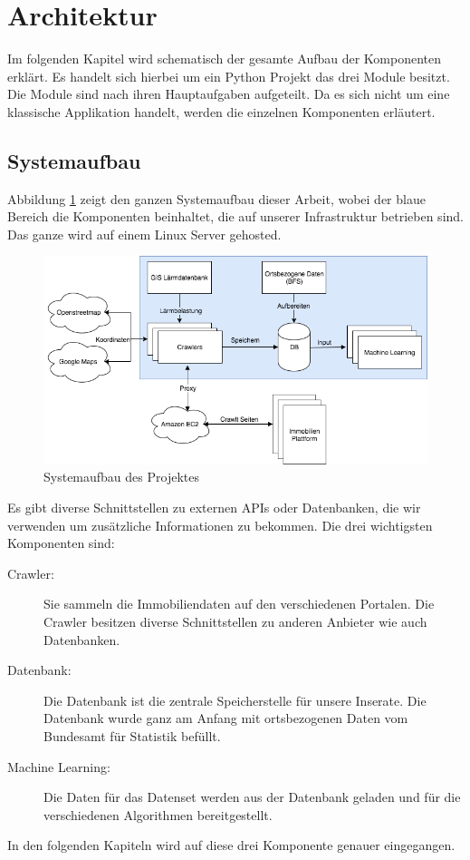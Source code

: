 \section{Architektur}
Im folgenden Kapitel wird schematisch der gesamte Aufbau der Komponenten erklärt. Es handelt sich hierbei um ein Python Projekt das drei Module besitzt. Die Module sind nach ihren Hauptaufgaben aufgeteilt. Da es sich nicht um eine klassische Applikation handelt, werden die einzelnen Komponenten erläutert.
%
\subsection{Systemaufbau}
Abbildung \ref{fig:system} zeigt den ganzen Systemaufbau dieser Arbeit, wobei der blaue Bereich die Komponenten beinhaltet, die auf unserer Infrastruktur betrieben sind. Das ganze wird auf einem Linux Server gehosted.\\
\begin{figure}[ht]
\centering
\includegraphics[width=\textwidth]{images/Architektur.png}
\caption[Systemaufbau des Projektes]{Systemaufbau des Projektes}%
\label{fig:system}
\end{figure}
Es gibt diverse Schnittstellen zu externen APIs oder Datenbanken, die wir verwenden um zusätzliche Informationen zu bekommen. Die drei wichtigsten Komponenten sind:
\begin{description}
\item[Crawler:] Sie sammeln die Immobiliendaten auf den verschiedenen Portalen. Die Crawler besitzen diverse Schnittstellen zu anderen Anbieter wie auch Datenbanken. 
\item[Datenbank:] Die Datenbank ist die zentrale Speicherstelle für unsere Inserate. Die Datenbank wurde ganz am Anfang mit ortsbezogenen Daten vom Bundesamt für Statistik befüllt. 
\item[Machine Learning:] Die Daten für das Datenset werden aus der Datenbank geladen und für die verschiedenen Algorithmen bereitgestellt.
\end{description}
In den folgenden Kapiteln wird auf diese drei Komponente genauer eingegangen.
%
